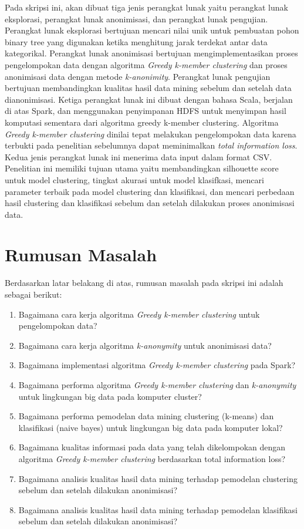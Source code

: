 Pada skripsi ini, akan dibuat tiga jenis perangkat lunak yaitu perangkat lunak eksplorasi, perangkat lunak anonimisasi, dan perangkat lunak pengujian. Perangkat lunak eksplorasi bertujuan mencari nilai unik untuk pembuatan pohon binary tree yang digunakan ketika menghitung jarak terdekat antar data kategorikal. Perangkat lunak anonimisasi bertujuan mengimplementasikan proses pengelompokan data dengan algoritma \textit{Greedy k-member clustering} dan proses anonimisasi data dengan metode {\it k-anonimity}. Perangkat lunak pengujian bertujuan membandingkan kualitas hasil data mining sebelum dan setelah data  dianonimisasi. Ketiga perangkat lunak ini dibuat dengan bahasa Scala, berjalan di atas Spark, dan menggunakan penyimpanan HDFS untuk menyimpan hasil komputasi sementara dari algoritma greedy k-member clustering. Algoritma {\it Greedy k-member clustering} dinilai tepat melakukan pengelompokan data karena terbukti pada penelitian sebelumnya dapat meminimalkan {\it total information loss}. Kedua jenis perangkat lunak ini menerima data input dalam format CSV. Penelitian ini memiliki tujuan utama yaitu membandingkan silhouette score untuk model clustering, tingkat akurasi untuk model klasifkasi, mencari parameter terbaik pada model clustering dan klasifikasi, dan mencari perbedaan hasil clustering dan klasifikasi sebelum dan setelah dilakukan proses anonimisasi data.

\section{Rumusan Masalah}
\label{sec:rumusan}
Berdasarkan latar belakang di atas, rumusan masalah pada skripsi ini adalah sebagai berikut:
\begin{enumerate}
\item Bagaimana cara kerja algoritma {\it Greedy k-member clustering} untuk pengelompokan data?
\item Bagaimana cara kerja algoritma {\it k-anonymity} untuk anonimisasi data?
\item Bagaimana implementasi algoritma {\it Greedy k-member clustering} pada Spark?
\item Bagaimana performa algoritma {\it Greedy k-member clustering} dan {\it k-anonymity} untuk lingkungan big data pada komputer cluster?
\item Bagaimana performa pemodelan data mining clustering (k-means) dan klasifikasi (naive bayes) untuk lingkungan big data pada komputer lokal?
\item Bagaimana kualitas informasi pada data yang telah dikelompokan dengan algoritma {\it Greedy k-member clustering} berdasarkan total information loss?
\item Bagaimana analisis kualitas hasil data mining terhadap pemodelan clustering sebelum dan setelah dilakukan anonimisasi?
\item Bagaimana analisis kualitas hasil data mining terhadap pemodelan klasifikasi sebelum dan setelah dilakukan anonimisasi?
\end{enumerate}

